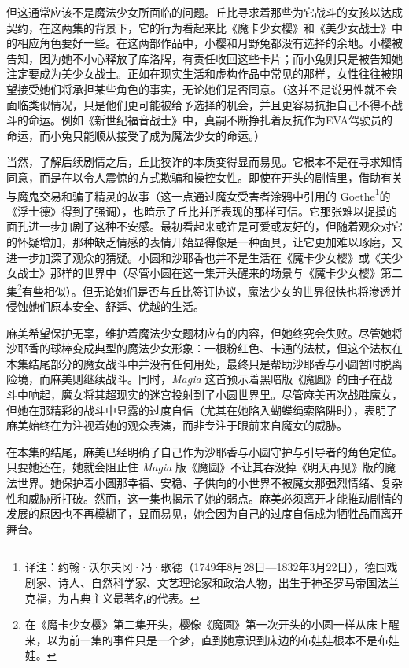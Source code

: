 但这通常应该不是魔法少女所面临的问题。丘比寻求着那些为它战斗的女孩以达成契约，在这两集的背景下，它的行为看起来比《魔卡少女樱》和《美少女战士》中的相应角色要好一些。在这两部作品中，小樱和月野兔都没有选择的余地。小樱被告知，因为她不小心释放了库洛牌，有责任收回这些卡片\cite{ref11}；而小兔则只是被告知她注定要成为美少女战士。正如在现实生活和虚构作品中常见的那样，女性往往被期望接受她们将承担某些角色的事实，无论她们是否同意\cite{ref22}。（这并不是说男性就不会面临类似情况，只是他们更可能被给予选择的机会，并且更容易抗拒自己不得不战斗的命运。例如《新世纪福音战士》中，真嗣不断挣扎着反抗作为EVA驾驶员的命运，而小兔只能顺从接受了成为魔法少女的命运。）

当然，了解后续剧情之后，丘比狡诈的本质变得显而易见。它根本不是在寻求知情同意，而是在以令人震惊的方式欺骗和操控女性。即使在开头的剧情里，借助有关与魔鬼交易和骗子精灵的故事（这一点通过魔女受害者涂鸦中引用的 Goethe\footnote{译注：约翰·沃尔夫冈·冯·歌德（1749年8月28日—1832年3月22日），德国戏剧家、诗人、自然科学家、文艺理论家和政治人物，出生于神圣罗马帝国法兰克福，为古典主义最著名的代表。}的《浮士德》得到了强调），也暗示了丘比并所表现的那样可信。它那张难以捉摸的面孔进一步加剧了这种不安感。最初看起来或许是可爱或友好的，但随着观众对它的怀疑增加，那种缺乏情感的表情开始显得像是一种面具，让它更加难以琢磨，又进一步加深了观众的猜疑。小圆和沙耶香也并不是生活在《魔卡少女樱》或《美少女战士》那样的世界中（尽管小圆在这一集开头醒来的场景与《魔卡少女樱》第二集\footnote{在《魔卡少女樱》第二集开头，樱像《魔圆》第一次开头的小圆一样从床上醒来，以为前一集的事件只是一个梦，直到她意识到床边的布娃娃根本不是布娃娃。}\cite{ref24}有些相似）。但无论她们是否与丘比签订协议，魔法少女的世界很快也将渗透并侵蚀她们原本安全、舒适、优越的生活。

麻美希望保护无辜，维护着魔法少女题材应有的内容，但她终究会失败。尽管她将沙耶香的球棒变成典型的魔法少女形象：一根粉红色、卡通的法杖，但这个法杖在本集结尾部分的魔女战斗中并没有任何用处，最终只是帮助沙耶香与小圆暂时脱离险境，而麻美则继续战斗。同时，\emph{Magia} 这首预示着黑暗版《魔圆》的曲子在战斗中响起，魔女将其超现实的迷宫投射到了小圆世界里。尽管麻美再次战胜魔女，但她在那精彩的战斗中显露的过度自信（尤其在她陷入蝴蝶绳索陷阱时），表明了麻美始终在为注视着她的观众表演，而非专注于眼前来自魔女的威胁。

在本集的结尾，麻美已经明确了自己作为沙耶香与小圆守护与引导者的角色定位。只要她还在，她就会阻止住 \emph{Magia} 版《魔圆》不让其吞没掉《明天再见》版的魔法世界。她保护着小圆那幸福、安稳、子供向的小世界不被魔女那强烈情绪、复杂性和威胁所打破。然而，这一集也揭示了她的弱点。麻美必须离开才能推动剧情的发展的原因也不再模糊了，显而易见，她会因为自己的过度自信成为牺牲品而离开舞台。
